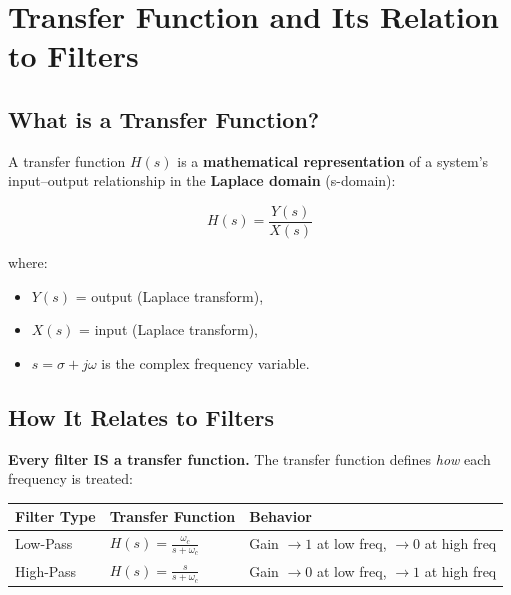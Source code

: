 \documentclass[12pt,a4paper]{article}
\begin{document}
\section{Transfer Function and Its Relation to Filters}

\subsection{What is a Transfer Function?}

A transfer function $H(s)$ is a \textbf{mathematical representation} of a system's input--output relationship in the \textbf{Laplace domain} (s-domain):

\begin{equation}
    H(s) = \frac{Y(s)}{X(s)}
\end{equation}

where:
\begin{itemize}
    \item $Y(s)$ = output (Laplace transform),
    \item $X(s)$ = input (Laplace transform),
    \item $s = \sigma + j\omega$ is the complex frequency variable.
\end{itemize}

\subsection{How It Relates to Filters}

\textbf{Every filter IS a transfer function.} The transfer function defines \emph{how} each frequency is treated:

\begin{center}
\begin{tabular}{lll}
    \toprule
    \textbf{Filter Type} & \textbf{Transfer Function} & \textbf{Behavior} \\
    \midrule
    Low-Pass  & $\displaystyle H(s) = \frac{\omega_c}{s + \omega_c}$ & Gain $\to 1$ at low freq, $\to 0$ at high freq \\[1em]
    High-Pass & $\displaystyle H(s) = \frac{s}{s + \omega_c}$        & Gain $\to 0$ at low freq, $\to 1$ at high freq \\
    \bottomrule
\end{tabular}
\end{center}
\end{document}
